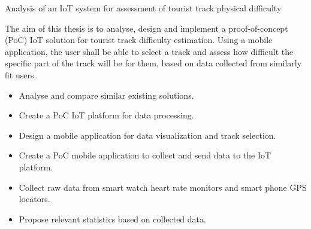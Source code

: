 \linebreak
Analysis of an IoT system for assessment of tourist track physical difficulty

The aim of this thesis is to analyse, design and implement a proof-of-concept (PoC) IoT solution for tourist track difficulty estimation.
Using a mobile application, the user shall be able to select a track and assess how difficult the specific part of the track will be for them, based on data collected from similarly fit users.
\begin{itemize}
    \item Analyse and compare similar existing solutions.
    \item Create a PoC IoT platform for data processing.
    \item Design a mobile application for data visualization and track selection.
    \item Create a PoC mobile application to collect and send data to the IoT platform.
    \item Collect raw data from smart watch heart rate monitors and smart phone GPS locators.
    \item Propose relevant statistics based on collected data.
\end{itemize}